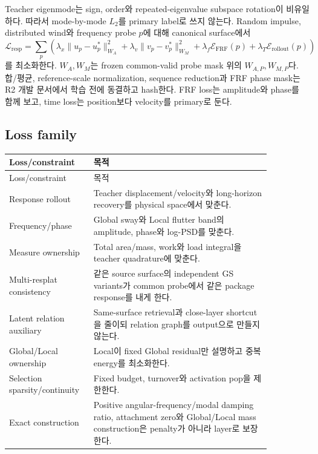 \documentclass[11pt]{article}
\begin{document}
Teacher eigenmode는 sign, order와 repeated-eigenvalue subspace rotation이 비유일하다.
따라서 mode-by-mode \(L_2\)를 primary label로 쓰지 않는다.
Random impulse, distributed wind와 frequency probe \(p\)에 대해 canonical surface에서
\begin{equation}
  \mathcal L_{\mathrm{resp}}
  =\sum_p\left(
  \lambda_x\|u_p-u_p^*\|_{W_A}^2+
  \lambda_v\|v_p-v_p^*\|_{W_M}^2+
  \lambda_f\mathcal E_{\mathrm{FRF}}(p)+
  \lambda_T\mathcal E_{\mathrm{rollout}}(p)
  \right)
  \label{eq:rd-response-loss}
\end{equation}
를 최소화한다. \(W_A,W_M\)는 frozen common-valid probe mask 위의
\(W_{A,P},W_{M,P}\)다. 합/평균, reference-scale normalization, sequence reduction과
FRF phase mask는 R2 개발 문서에서 학습 전에 동결하고 hash한다.
FRF loss는 amplitude와 phase를 함께 보고, time loss는 position보다 velocity를 primary로 둔다.

\subsection{Loss family}

\begin{longtable}{L{0.24\linewidth}L{0.62\linewidth}}
\toprule
Loss/constraint & 목적\\
\midrule
\endfirsthead
\toprule
Loss/constraint & 목적\\
\midrule
\endhead
Response rollout & Teacher displacement/velocity와 long-horizon recovery를 physical space에서 맞춘다.\\
Frequency/phase & Global sway와 Local flutter band의 amplitude, phase와 log-PSD를 맞춘다.\\
Measure ownership & Total area/mass, work와 load integral을 teacher quadrature에 맞춘다.\\
Multi-resplat consistency & 같은 source surface의 independent GS variants가 common probe에서 같은 package response를 내게 한다.\\
Latent relation auxiliary & Same-surface retrieval과 close-layer shortcut을 줄이되 relation graph를 output으로 만들지 않는다.\\
Global/Local ownership & Local이 fixed Global residual만 설명하고 중복 energy를 최소화한다.\\
Selection sparsity/continuity & Fixed budget, turnover와 activation pop을 제한한다.\\
Exact construction & Positive angular-frequency/modal damping ratio, attachment zero와 Global/Local mass construction은 penalty가 아니라 layer로 보장한다.\\
\bottomrule
\end{longtable}
\end{document}
